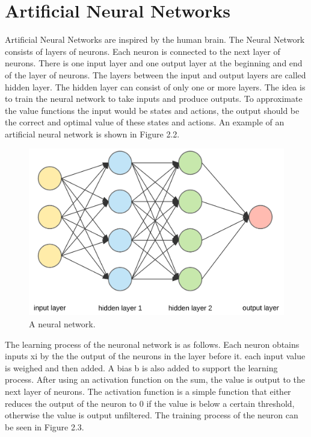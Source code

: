 
\vspace{1cm}

\section{Artificial Neural Networks}

Artificial Neural Networks are inspired by the human brain. 
The Neural Network consists of layers of neurons. Each neuron is connected to the next layer of neurons. There is one input layer and one output layer at the beginning and end of the layer of neurons. The layers between the input and output layers are called hidden layer. The hidden layer can consist of only one or more layers. The idea is to train the neural network to take inputs and produce outputs. To approximate the value functions the input would be states and actions, the output should be the correct and optimal value of these states and actions. An example of an artificial neural network is shown in Figure 2.2.

\begin{figure}
	
	\centering
	\includegraphics[width=1\textwidth]{figures/neural_network.png}
	\caption{A neural network. %
	}
\end{figure}

The learning process of the neuronal network is as follows. Each neuron obtains inputs xi by the the output of the neurons in the layer before it. each input value is weighed and then added. A bias b is also added to support the learning process. After using an activation function on the sum, the value is output to the next layer of neurons. The activation function is a simple function that either reduces the output of the neuron to 0 if the value is below a certain threshold, otherwise the value is output unfiltered.
The training process of the neuron can be seen in Figure 2.3.

